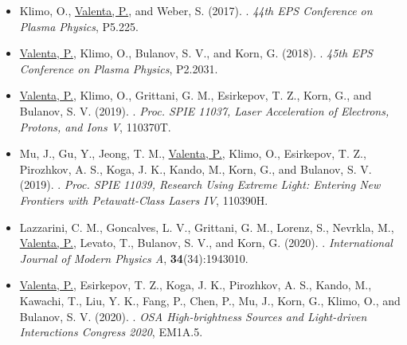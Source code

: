 \documentclass[10pt, a4paper, twoside, openright]{report}
\newcommand{\link}[3][blue]{\href{#2}{\color{#1}{#3}}}%
\begin{document}
\begin{itemize}
	
	\item Klimo, O., \underline{Valenta, P.}, and Weber, S. (2017). \link{http://ocs.ciemat.es/EPS2017PAP/pdf/P5.225.pdf}{Laser absorption and ion acceleration under tight-focusing conditions}. \textit{44th EPS Conference on Plasma Physics}, P5.225.
	
	\item \underline{Valenta, P.}, Klimo, O., Bulanov, S. V., and Korn, G. (2018). \link{http://ocs.ciemat.es/EPS2018PAP/pdf/P2.2031.pdf}{On high-quality electron beam generated by breaking wake wave in near-critical density plasmas}. \textit{45th EPS Conference on Plasma Physics}, P2.2031. 
	
	\item \underline{Valenta, P.}, Klimo, O., Grittani, G. M., Esirkepov, T. Z., Korn, G., and Bulanov, S. V. (2019). \link{http://dx.doi.org/10.1117/12.2521040}{Wakefield excited by ultrashort laser pulses in near-critical density plasmas}. \textit{Proc. SPIE 11037, Laser Acceleration of Electrons, Protons, and Ions V}, 110370T.
	
	\item Mu, J., Gu, Y., Jeong, T. M., \underline{Valenta, P.}, Klimo, O., Esirkepov, T. Z., Pirozhkov, A. S., Koga, J. K., Kando, M., Korn, G., and Bulanov, S. V. (2019). \link{http://dx.doi.org/10.1117/12.2524653}{High order harmonics generation via laser reflection at electron density peaks}. \textit{Proc. SPIE 11039, Research Using Extreme Light: Entering New Frontiers with Petawatt-Class Lasers IV}, 110390H.
	
	\item Lazzarini, C. M., Goncalves, L. V., Grittani, G. M., Lorenz, S., Nevrkla, M., \underline{Valenta, P.}, Levato, T., Bulanov, S. V., and Korn, G. (2020). \link{http://dx.doi.org/10.1142/S0217751X19430103}{Electron acceleration at ELI Beamlines: towards high-energy and high-repetition-rate accelerators}. \textit{International Journal of Modern Physics A}, \textbf{34}(34):1943010.
	
	\item \underline{Valenta, P.}, Esirkepov, T. Z., Koga, J. K., Pirozhkov, A. S., Kando, M., Kawachi, T., Liu, Y. K., Fang, P., Chen, P., Mu, J., Korn, G., Klimo, O., and Bulanov, S. V. (2020). \link{http://dx.doi.org/10.1364/EUVXRAY.2020.EM1A.5}{Relativistic flying mirrors as a compact source of coherent short-wavelength radiation}. \textit{OSA High-brightness Sources and Light-driven Interactions Congress 2020}, EM1A.5.
	

\end{itemize}
\end{document}
